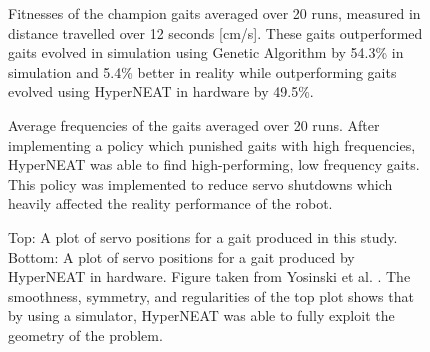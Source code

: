 %
%

\begin{figure}
\begin{center}
\vspace{1cm}
\caption[ ]{Fitnesses of the champion gaits averaged over 20 runs, measured in distance travelled over 12 seconds [cm/s]. These gaits outperformed gaits evolved in simulation using Genetic Algorithm by 54.3\% in simulation and 5.4\% better in reality while outperforming gaits evolved using HyperNEAT in hardware by 49.5\%.}
\end{center}
\end{figure}


\begin{figure}
\begin{center}
\vspace{1cm}
\caption[ ]{Average frequencies of the gaits averaged over 20 runs. After implementing a policy which punished gaits with high frequencies, HyperNEAT was able to find high-performing, low frequency gaits. This policy was implemented to reduce servo shutdowns which heavily affected the reality performance of the robot.}
\end{center}
\end{figure}


\begin{figure}
\begin{center}
\vspace{1cm}
\caption[ ]{Top: A plot of servo positions for a gait produced in this study. Bottom: A plot of servo positions for a gait produced by HyperNEAT in hardware. Figure taken from Yosinski et al. \cite{yos:clune}. The smoothness, symmetry, and regularities of the top plot shows that by using a simulator, HyperNEAT was able to fully exploit the geometry of the problem.}
\end{center}
\end{figure}

